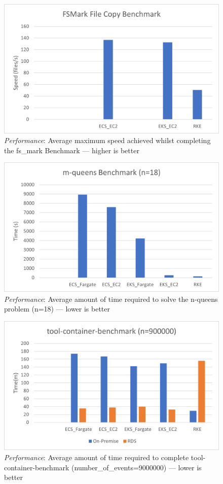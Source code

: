 \begin{figure}[hp]
  \includegraphics{images/perf-FSMark.png}
  \caption{\emph{Performance}: Average maximum speed achieved whilst completing the fs\_mark Benchmark --- higher is better}
  \label{fig:perf_FSMark}
\end{figure}

\begin{figure}[hp]
  \includegraphics{images/perf-m_queens.png}
  \caption{\emph{Performance}: Average amount of time required to solve the n-queens problem (n=18) --- lower is better}
  \label{fig:perf_mQueens}
\end{figure}

\begin{figure}[hp]
  \includegraphics{images/perf-tcb_default.png}
  \caption{\emph{Performance}: Average amount of time required to complete tool-container-benchmark (number\_of\_events=9000000) --- lower is better}
  \label{fig:perf_tcb_default}
\end{figure}

